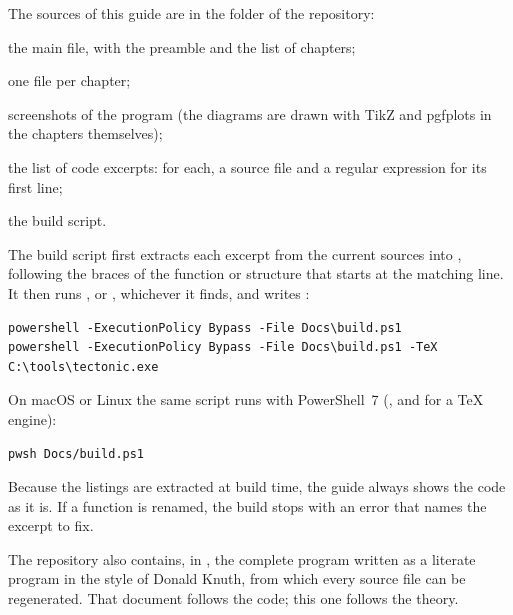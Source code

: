 The sources of this guide are in the  folder of the repository:
\begin{description}[font=\normalfont\ttfamily]
\item[guide.tex] the main file, with the preamble and the list of chapters;
\item[chapters/] one file per chapter;
\item[figures/] screenshots of the program (the diagrams are drawn with TikZ and pgfplots in
the chapters themselves);
\item[excerpts.txt] the list of code excerpts: for each, a source file and a regular expression
for its first line;
\item[build.ps1] the build script.
\end{description}
The build script first extracts each excerpt from the current sources into ,
following the braces of the function or structure that starts at the matching line. It then runs
,  or , whichever it finds, and writes
:
\begin{lstlisting}[language={},numbers=none,basicstyle=\ttfamily\small]
powershell -ExecutionPolicy Bypass -File Docs\build.ps1
powershell -ExecutionPolicy Bypass -File Docs\build.ps1 -TeX C:\tools\tectonic.exe
\end{lstlisting}
On macOS or Linux the same script runs with PowerShell~7 (,
and  for a TeX engine):
\begin{lstlisting}[language={},numbers=none,basicstyle=\ttfamily\small]
pwsh Docs/build.ps1
\end{lstlisting}
Because the listings are extracted at build time, the guide always shows the code as it is. If a
function is renamed, the build stops with an error that names the excerpt to fix.

The repository also contains, in , the complete program written as a literate
program in the style of Donald Knuth, from which every source file can be regenerated. That
document follows the code; this one follows the theory.

